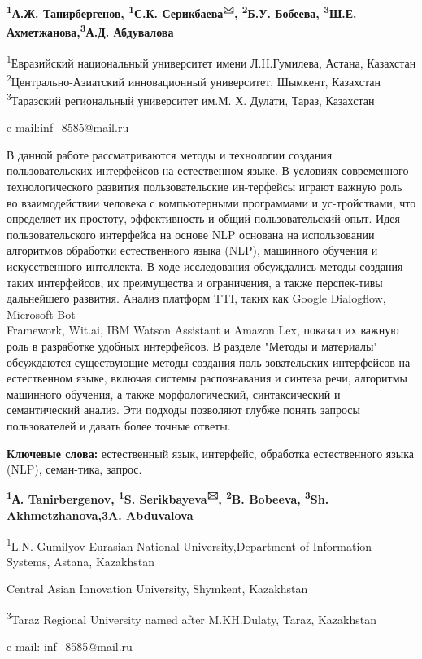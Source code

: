 \begin{center}

{\bfseries \textsuperscript{1}А.Ж. Танирбергенов, \textsuperscript{1}С.К.
Серикбаева\textsuperscript{🖂}, \textsuperscript{2}Б.У. Бөбеева,
\textsuperscript{3}Ш.Е. Ахметжанова,\textsuperscript{3}А.Д. Абдувалова}

\textsuperscript{1}Евразийский национальный университет имени
Л.Н.Гумилева, Астана, Казахстан \textsuperscript{2}Центрально-Азиатский
инновационный университет, Шымкент, Казахстан \\ \textsuperscript{3}Таразский региональный университет им.М. Х. Дулати,
Тараз, Казахстан

e-mail:inf\_8585@mail.ru
\end{center}

В данной работе рассматриваются методы и технологии создания
пользовательских интерфейсов на естественном языке. В условиях
современного технологического развития пользовательские ин-терфейсы
играют важную роль во взаимодействии человека с компьютерными
программами и ус-тройствами, что определяет их простоту, эффективность и
общий пользовательский опыт. Идея пользовательского интерфейса на основе
NLP основана на использовании алгоритмов обработки естественного языка
(NLP), машинного обучения и искусственного интеллекта. В ходе
исследования обсуждались методы создания таких интерфейсов, их
преимущества и ограничения, а также перспек-тивы дальнейшего развития.
Анализ платформ TTI, таких как Google Dialogflow, Microsoft Bot
\\Framework, Wit.ai, IBM Watson Assistant и Amazon Lex, показал их важную
роль в разработке удобных интерфейсов. В разделе "Методы и материалы"
обсуждаются существующие методы создания поль-зовательских интерфейсов на
естественном языке, включая системы распознавания и синтеза речи,
алгоритмы машинного обучения, а также морфологический, синтаксический и
семантический анализ. Эти подходы позволяют глубже понять запросы
пользователей и давать более точные ответы.

{\bfseries Ключевые слова:} естественный язык, интерфейс, обработка
естественного языка (NLP), семан-тика, запрос.

\begin{center}
{\bfseries \textsuperscript{1}А. Tanirbergenov, \textsuperscript{1}S.
Serikbayeva\textsuperscript{🖂}, \textsuperscript{2}B. Bobeeva,
\textsuperscript{3}Sh. Akhmetzhanova,{3}A. Abduvalova}

\textsuperscript{1}L.N. Gumilyov Eurasian National University,Department
of Information Systems, Astana, Kazakhstan

Central Asian Innovation University, Shymkent, Kazakhstan

\textsuperscript{3}Taraz Regional University named after M.KH.Dulaty,
Taraz, Kazakhstan

e-mail: inf\_8585@mail.ru
\end{center}

